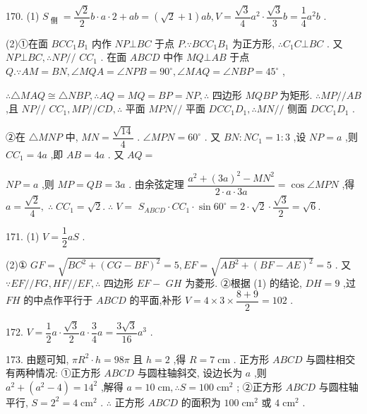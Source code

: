 170. (1) ${S}_{\text{ 侧 }} = \dfrac{\sqrt{2}}{2}b \cdot  a \cdot  2 + {ab} = \left( {\sqrt{2} + 1}\right) {ab},V = \dfrac{\sqrt{3}}{4}{a}^{2} \cdot  \dfrac{\sqrt{3}}{3}b = \dfrac{1}{4}{a}^{2}b$ .

(2)①在面 ${BC}{C}_{1}{B}_{1}$ 内作 ${NP}\bot {BC}$ 于点 $P.\because {BC}{C}_{1}{B}_{1}$ 为正方形, $\therefore {C}_{1}C\bot {BC}$ . 又 ${NP}\bot {BC},\therefore {NP}//$  $C{C}_{1}$ . 在面 ${ABCD}$ 中作 ${MQ}\bot {AB}$ 于点 $Q.\because {AM} = {BN},\angle {MQA} = \angle {NPB} = {90}^{ \circ  },\angle {MAQ} = \angle {NBP} = {45}^{ \circ  }$ ,

$\therefore  \bigtriangleup  {MAQ} \cong   \bigtriangleup  {NBP},\therefore {AQ} = {MQ} = {BP} = {NP},\therefore$ 四边形 ${MQBP}$ 为矩形. $\therefore {MP}//{AB}$ ,且 ${NP}//$  $C{C}_{1},{MP}//{CD},\therefore$ 平面 ${MPN}//$ 平面 ${DC}{C}_{1}{D}_{1},\therefore {MN}//$ 侧面 ${DC}{C}_{1}{D}_{1}$ .

②在 $\bigtriangleup {MNP}$ 中, ${MN} = \dfrac{\sqrt{14}}{4}$ . $\angle {MPN} = {60}^{ \circ  }$ . 又 ${BN} : N{C}_{1} = 1 : 3$ ,设 ${NP} = a$ ,则 $C{C}_{1} = {4a}$ ,即 ${AB} = {4a}$ . 又 ${AQ} =$

${NP} = a$ ,则 ${MP} = {QB} = {3a}$ . 由余弦定理 $\dfrac{{a}^{2} + {\left( 3a\right) }^{2} - M{N}^{2}}{2 \cdot  a \cdot  {3a}} = \cos \angle {MPN}$ ,得 $a = \dfrac{\sqrt{2}}{4},\;\therefore \;C{C}_{1} = \sqrt{2}.\;\therefore \;V =$  ${S}_{ABCD} \cdot  C{C}_{1} \cdot  \sin {60}^{ \circ  } = 2 \cdot  \sqrt{2} \cdot  \dfrac{\sqrt{3}}{2} = \sqrt{6}.$

171. (1) $V = \dfrac{1}{2}{aS}$ .

(2)① ${GF} = \sqrt{B{C}^{2} + {\left( CG - BF\right) }^{2}} = 5,{EF} = \sqrt{A{B}^{2} + {\left( BF - AE\right) }^{2}} = 5$ . 又 $\because {EF}//{FG},{HF}//{EF},\therefore$ 四边形 ${EF} -$  ${GH}$ 为菱形. ②根据 (1) 的结论, ${DH} = 9$ ,过 ${FH}$ 的中点作平行于 ${ABCD}$ 的平面,补形 $V = 4 \times  3 \times  \dfrac{8 + 9}{2} = {102}$ .

172. $V = \dfrac{1}{2}a \cdot  \dfrac{\sqrt{3}}{2}a \cdot  \dfrac{3}{4}a = \dfrac{3\sqrt{3}}{16}{a}^{3}$ .

173. 由题可知, $\pi {R}^{2} \cdot  h = {98\pi }$ 且 $h = 2$ ,得 $R = 7\mathrm{\;{cm}}$ . 正方形 ${ABCD}$ 与圆柱相交有两种情况: ①正方形 ${ABCD}$ 与圆柱轴斜交, 设边长为 $a$ ,则 ${a}^{2} + \left( {{a}^{2} - 4}\right)  = {14}^{2}$ ,解得 $a = {10}\mathrm{\;{cm}},\therefore S = {100}{\mathrm{\;{cm}}}^{2}$ ; ②正方形 ${ABCD}$ 与圆柱轴平行, $S = {2}^{2} = 4{\mathrm{\;{cm}}}^{2}$ . $\therefore$ 正方形 ${ABCD}$ 的面积为 ${100}{\mathrm{\;{cm}}}^{2}$ 或 $4{\mathrm{\;{cm}}}^{2}$ .

